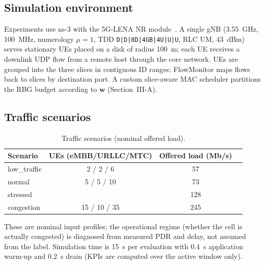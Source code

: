 \documentclass[conference]{IEEEtran}
\newif\ifdraftpending
\newcommand{\pending}[1]{%
  \ifdraftpending{\color{red}\textbf{[PENDING-v2: #1]}}\else{}\fi}
\begin{document}
\subsection{Simulation environment}
Experiments use ns-3 with the 5G-LENA NR module~\cite{5glena}. A single gNB
(3.55~GHz, 100~MHz, numerology $\mu{=}1$, TDD \texttt{D|D|8D|4GB|4U|U|U}, RLC
UM, 43~dBm) serves stationary UEs placed on a disk of radius 100~m; each UE
receives a downlink UDP flow from a remote host through the core network. UEs
are grouped into the three slices in contiguous ID ranges; FlowMonitor maps
flows back to slices by destination port. A custom slice-aware MAC scheduler
partitions the RBG budget according to $\mathbf{w}$ (Section~III-A).

\subsection{Traffic scenarios}
\pending{confirm final scenario table. Four scenarios in the main paper
(low\_traffic, normal, congestion, stressed); a fifth profile
(insufficient\_resources) is simulated and reported as a robustness check.}

\begin{table}[t]
\centering
\caption{Traffic scenarios (nominal offered load).}
\label{tab:scenarios}
\begin{tabular}{lccc}
\toprule
Scenario & UEs (eMBB/URLLC/MTC) & Offered load (Mb/s) \\
\midrule
low\_traffic & 2 / 2 / 6 & 57 \\
normal & 5 / 5 / 10 & 73 \\
stressed & \pending{n} & 128 \\
congestion & 15 / 10 / 35 & 245 \\
\bottomrule
\end{tabular}
\end{table}

These are nominal input profiles; the operational regime (whether the cell is
actually congested) is diagnosed from measured PDR and delay, not assumed from
the label. Simulation time is 15~s per evaluation with 0.4~s application
warm-up and 0.2~s drain (KPIs are computed over the active window only).
\end{document}
